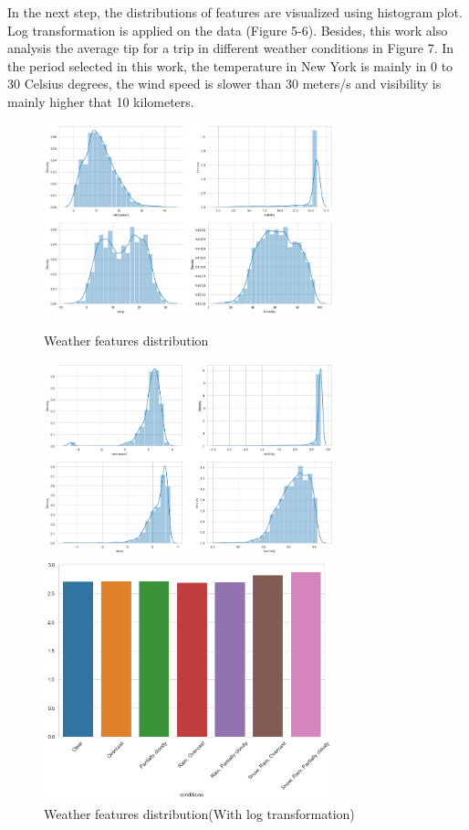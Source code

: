 \documentclass[11pt]{article}
\begin{document}
In the next step, the distributions of features are visualized using histogram plot. Log transformation is applied on the data (Figure 5-6). Besides, this work also analysis the average tip for a trip in different weather conditions in Figure 7. In the period selected in this work, the temperature in New York is mainly in 0 to 30 Celsius degrees, the wind speed is slower than 30 meters/s and visibility is mainly higher that 10 kilometers. 
\begin{figure}[h]
\centering
\begin{minipage}[t]{0.48\textwidth}
\centering
    \includegraphics[width=0.75\textwidth]{plots/weather-1.png}
    \caption{Weather features distribution}
\end{minipage}
\begin{minipage}[t]{0.48\textwidth}
\centering
    \includegraphics[width=0.75\textwidth]{plots/weather-2.png}
    \caption{Weather features distribution(With log transformation)}
\end{minipage}
\begin{minipage}[t]{0.35\textwidth}
\centering
    \includegraphics[width=0.75\textwidth]{plots/avg-tip-weather.png}

\end{minipage}
\end{figure}
\end{document}
